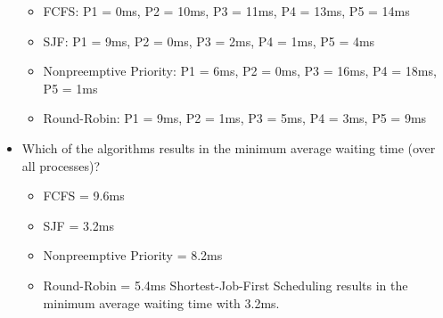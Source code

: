 \documentclass[letterpaper, 10pt,DIV=13]{scrartcl}
\numberwithin{equation}{section} %
\numberwithin{figure}{section} %
\numberwithin{table}{section} %
\begin{document}
\begin{itemize}
    \begin{itemize}
        \item FCFS: P1 = 0ms, P2 = 10ms, P3 = 11ms, P4 = 13ms, P5 = 14ms
        \item SJF: P1 = 9ms, P2 = 0ms, P3 = 2ms, P4 = 1ms, P5 = 4ms
        \item Nonpreemptive Priority: P1 = 6ms, P2 = 0ms, P3 = 16ms, P4 = 18ms, P5 = 1ms
        \item Round-Robin: P1 = 9ms, P2 = 1ms, P3 = 5ms, P4 = 3ms, P5 = 9ms
    \end{itemize}
    \item Which of the algorithms results in the minimum average waiting time (over all processes)?
    \begin{itemize}
        \item FCFS = 9.6ms
        \item SJF = 3.2ms
        \item Nonpreemptive Priority = 8.2ms
        \item Round-Robin = 5.4ms
Shortest-Job-First Scheduling results in the minimum average waiting time with 3.2ms.
    \end{itemize}
\end{itemize}


\pagebreak
\end{document}
